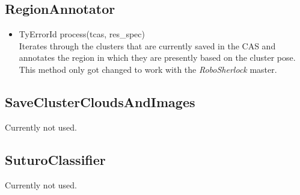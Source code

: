 \documentclass[main.tex]{subfiles}
\begin{document}
\subsection{RegionAnnotator}
\begin{itemize}
\item TyErrorId process(tcas, res\_spec)\\
Iterates through the clusters that are currently saved in the CAS and annotates the region in which they are presently based on the cluster pose.
This method only got changed to work with the \textit{RoboSherlock} master.
\end{itemize}

\subsection{SaveClusterCloudsAndImages}
Currently not used.

\subsection{SuturoClassifier}
Currently not used.
\end{document}
